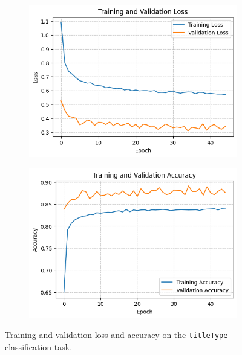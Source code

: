 \begin{figure}[H]
    \centering
    \begin{subfigure}[b]{0.48\textwidth}
        \centering
        \includegraphics[width=\textwidth]{plotsss/loss_titletype.png}
        \label{fig:loss_nn_titletype}
    \end{subfigure}
    \hfill
    \begin{subfigure}[b]{0.48\textwidth}
        \centering
        \includegraphics[width=\textwidth]{plotsss/accuracy_titletype.png}
        \label{fig:accuracy_nn_titletype}
    \end{subfigure}
    \caption{Training and validation loss and accuracy on the \texttt{titleType} classification task.}
    \label{fig:nn_performance_titletype}
\end{figure}


